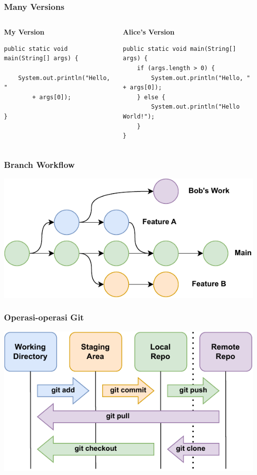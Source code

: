\documentclass[aspectratio=169, table]{beamer}
\begin{document}
	
\begin{frame}[fragile]
\frametitle{Many Versions}
\begin{columns}[t]
\begin{column}{.5\textwidth}
\textbf{My Version}
\begin{lstlisting}[style=java,basicstyle=\ttfamily\scriptsize]
public static void main(String[] args) {
	
	System.out.println("Hello, " 
		+ args[0]);
	
}
\end{lstlisting}
\end{column}
\begin{column}{.5\textwidth}
\textbf{Alice's Version}
\begin{lstlisting}[style=java,basicstyle=\ttfamily\scriptsize]
public static void main(String[] args) {
	if (args.length > 0) {
		System.out.println("Hello, " + args[0]);
	} else {
		System.out.println("Hello World!");
	}
}
\end{lstlisting}
\end{column}
\end{columns}

\end{frame}

	\begin{frame}[fragile]
	\frametitle{Branch Workflow}
	\vspace{25pt}
	\begin{center}
		\includegraphics[width=.90\textwidth]{../images/branch}
	\end{center}
\end{frame}
	
	\begin{frame}[fragile]
		\frametitle{Operasi-operasi Git}
		\vspace{25pt}
		\begin{center}
			\includegraphics[width=.75\textwidth]{../images/diagram}
		\end{center}
	\end{frame}
	
\end{document}
